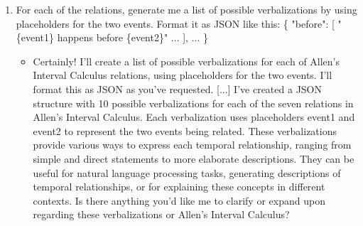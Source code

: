 \documentclass[11pt]{article}
\begin{document}
\begin{enumerate}
    \begin{itemize}
      \item Certainly, I'll create 10 new examples for each relation, ensuring they are distinct from the previous set and that the "equals" relation focuses solely on temporal periods. I'll maintain the same JSON structure and adhere to the guidelines you've provided.
        [...]
I've created a new set of 10 examples for each of the seven relations in Allen's Interval Calculus. These examples are distinct from the previous set and adhere to the guidelines you provided. For the "equals" relation, I've ensured that all examples focus solely on temporal periods.
Each relation is represented by an array of examples, with each example containing "event1", "event2", and an "example" sentence describing the relation between the events.
Is there anything you'd like me to clarify or expand upon regarding these new examples or Allen's Interval Calculus?
    \end{itemize}
  \item For each of the relations, generate me a list of possible verbalizations by using placeholders for the two events. Format it as JSON like this: \{ "before": [ "\{event1\} happens before \{event2\}" ... ], ... \}
    \begin{itemize}
      \item Certainly! I'll create a list of possible verbalizations for each of Allen's Interval Calculus relations, using placeholders for the two events. I'll format this as JSON as you've requested.
        [...]
        I've created a JSON structure with 10 possible verbalizations for each of the seven relations in Allen's Interval Calculus. Each verbalization uses placeholders {event1} and {event2} to represent the two events being related.
These verbalizations provide various ways to express each temporal relationship, ranging from simple and direct statements to more elaborate descriptions. They can be useful for natural language processing tasks, generating descriptions of temporal relationships, or for explaining these concepts in different contexts.
Is there anything you'd like me to clarify or expand upon regarding these verbalizations or Allen's Interval Calculus?
    \end{itemize}
\end{enumerate}
\end{document}
